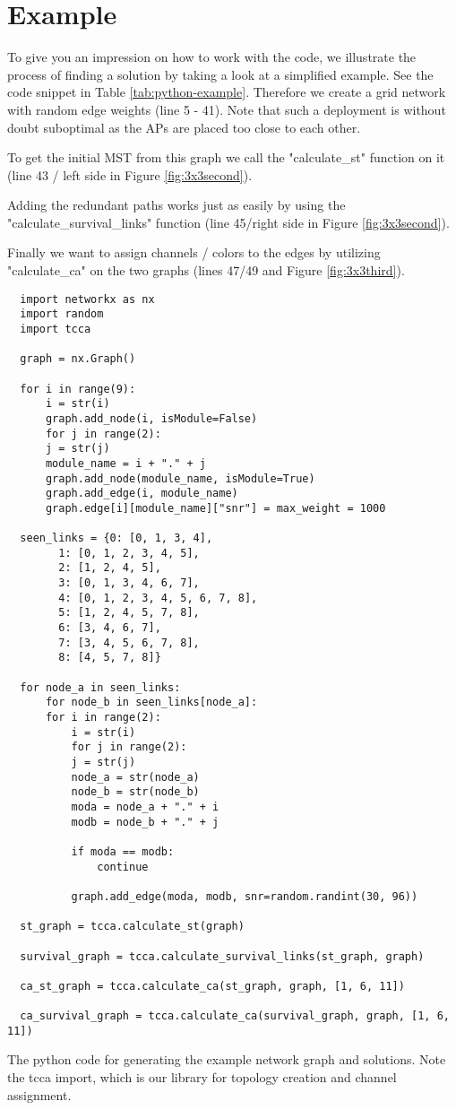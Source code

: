   \section{Example}
    To give you an impression on how to work with the code, we illustrate the process of finding a solution by taking a look at a simplified example.
    See the code snippet in Table \ref{tab:python-example}.
    Therefore we create a grid network with random edge weights (line 5 - 41).
    Note that such a deployment is without doubt suboptimal as the APs are placed too close to each other.

    To get the initial \ac{MST} from this graph we call the "calculate\_st" function on it (line 43 / left side in Figure \ref{fig:3x3second}).
    
    Adding the redundant paths works just as easily by using the "calculate\_survival\_links" function (line 45/right side in Figure \ref{fig:3x3second}).
    
    Finally we want to assign channels / colors to the edges by utilizing "calculate\_ca" on the two graphs (lines 47/49 and Figure \ref{fig:3x3third}).
    
    \newpage
    
    \begin{table}[h!]
    \lstset{language=Python}
    \begin{lstlisting}
  import networkx as nx
  import random
  import tcca

  graph = nx.Graph()

  for i in range(9):
      i = str(i)
      graph.add_node(i, isModule=False)
      for j in range(2):
	  j = str(j)
	  module_name = i + "." + j
	  graph.add_node(module_name, isModule=True)
	  graph.add_edge(i, module_name)
	  graph.edge[i][module_name]["snr"] = max_weight = 1000

  seen_links = {0: [0, 1, 3, 4], 
		1: [0, 1, 2, 3, 4, 5], 
		2: [1, 2, 4, 5], 
		3: [0, 1, 3, 4, 6, 7], 
		4: [0, 1, 2, 3, 4, 5, 6, 7, 8], 
		5: [1, 2, 4, 5, 7, 8], 
		6: [3, 4, 6, 7], 
		7: [3, 4, 5, 6, 7, 8], 
		8: [4, 5, 7, 8]}

  for node_a in seen_links:
      for node_b in seen_links[node_a]:
	  for i in range(2):
	      i = str(i)
	      for j in range(2):
		  j = str(j)
		  node_a = str(node_a)
		  node_b = str(node_b)
		  moda = node_a + "." + i
		  modb = node_b + "." + j

		  if moda == modb:
		      continue

		  graph.add_edge(moda, modb, snr=random.randint(30, 96))

  st_graph = tcca.calculate_st(graph)

  survival_graph = tcca.calculate_survival_links(st_graph, graph)

  ca_st_graph = tcca.calculate_ca(st_graph, graph, [1, 6, 11])

  ca_survival_graph = tcca.calculate_ca(survival_graph, graph, [1, 6, 11])
    \end{lstlisting}
    \caption{The python code for generating the example network graph and solutions. 
      Note the tcca import, which is our library for topology creation and channel assignment.}
    \label{tab:python-example}
  \end{table}
  
